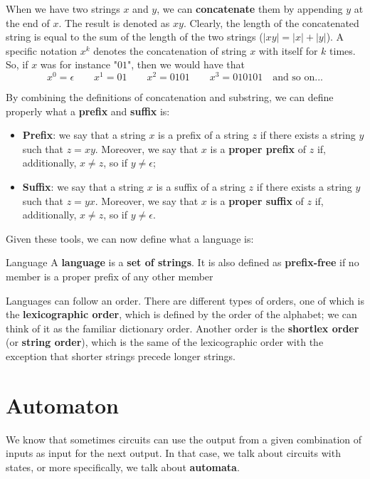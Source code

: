 \noindent When we have two strings $x$ and $y$, we can \textbf{concatenate} them by appending $y$ at the end of $x$. The result is denoted as $xy$. Clearly, the length of the concatenated string is equal to the sum of the length of the two strings ($|xy| = |x| + |y|$). A specific notation $x^k$ denotes the concatenation of string $x$ with itself for $k$ times. So, if $x$ was for instance "$01$", then we would have that
\[ x^0 = \epsilon \quad \quad x^1 = 01 \quad \quad x^2 = 0101 \quad \quad x^3 = 010101 \quad \text{and so on...} \]

\noindent By combining the definitions of concatenation and substring, we can define properly what a \textbf{prefix} and \textbf{suffix} is:
\begin{itemize}
    \item \textbf{Prefix}: we say that a string $x$ is a prefix of a string $z$ if there exists a string $y$ such that $z = xy$. Moreover, we say that $x$ is a \textbf{proper prefix} of $z$ if, additionally, $x \neq z$, so if $y \neq \epsilon$;
    \item \textbf{Suffix}: we say that a string $x$ is a suffix of a string $z$ if there exists a string $y$ such that $z = yx$. Moreover, we say that $x$ is a \textbf{proper suffix} of $z$ if, additionally, $x \neq z$, so if $y \neq \epsilon$.
\end{itemize}

\noindent Given these tools, we can now define what a language is:

\begin{definition}{Language}
    A \textbf{language} is a \textbf{set of strings}. It is also defined as \textbf{prefix-free} if no member is a proper prefix of any other member
\end{definition}

\noindent Languages can follow an order. There are different types of orders, one of which is the \textbf{lexicographic order}, which is defined by the order of the alphabet; we can think of it as the familiar dictionary order. Another order is the \textbf{shortlex order} (or \textbf{string order}), which is the same of the lexicographic order with the exception that shorter strings precede longer strings.

\section{Automaton}

We know that sometimes circuits can use the output from a given combination of inputs as input for the next output. In that case, we talk about circuits with states, or more specifically, we talk about \textbf{automata}.


